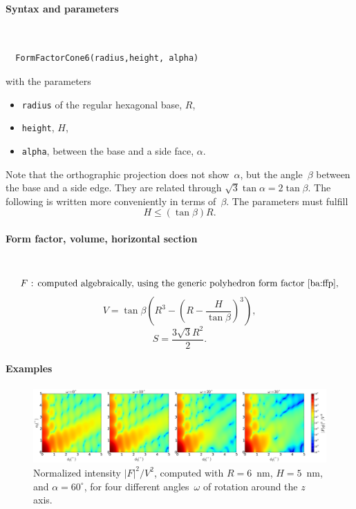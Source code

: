 \paragraph{Syntax and parameters}\strut\\[-2ex plus .2ex minus .2ex]
\begin{lstlisting}
  FormFactorCone6(radius,height, alpha)
\end{lstlisting}
with the parameters
\begin{itemize}
\item \texttt{radius} of the regular hexagonal base, $R$,
\item \texttt{height}, $H$,
\item \texttt{alpha}, between the base and a side face, $\alpha$.
\end{itemize}
Note that the orthographic projection does not show~$\alpha$,
but the angle~$\beta$ between the base and a side edge.
They are related through $\sqrt{3}\tan \alpha = 2 \tan \beta$.
The following is written more conveniently in terms of~$\beta$.
The parameters must fulfill
\begin{displaymath}
  H \le (\tan\beta)R.
\end{displaymath}

\paragraph{Form factor, volume, horizontal section}\strut\\
\begin{equation*}
  F \text{~: computed algebraically,
          using the generic polyhedron form factor~\cite{ba:ffp},}
\end{equation*}
\begin{equation*}
  V = \tan\beta  \left( R^3- \left(R-\frac{H}{\tan\beta}\right)^3 \right),
\end{equation*}
\begin{equation*}
  S =\dfrac{3\sqrt{3}R^2}{2}.
\end{equation*}

\paragraph{Examples}\strut

\begin{figure}[H]
\begin{center}
\includegraphics[width=\textwidth]{fig/ff2/ff_Cone6.pdf}
\end{center}
\caption{Normalized intensity $|F|^2/V^2$,
computed with $R=6$~nm, $H=5$~nm, and $\alpha=60^\circ$,
for four different angles~$\omega$ of rotation around the $z$ axis.}
\end{figure}

